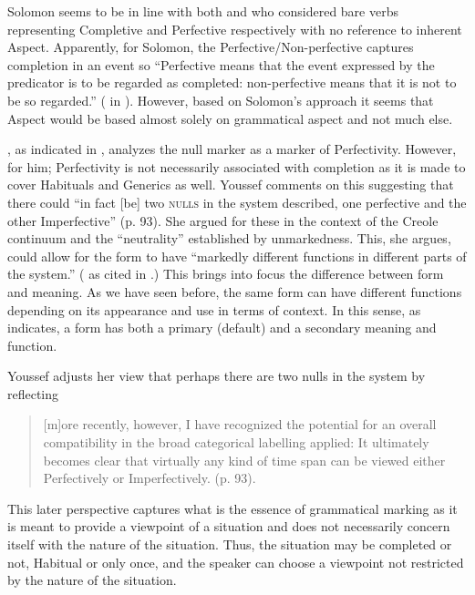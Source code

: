 Solomon seems to be in line with both \citet{Voorhoeve1957} and
\citet{Alleyne1980} who considered bare verbs representing Completive
and Perfective respectively with no reference to inherent Aspect.
Apparently, for Solomon, the Perfective\slash Non-perfective captures
completion in an event so “Perfective means that the event expressed
by the predicator is to be regarded as completed: non-perfective means
that it is not to be so regarded.” (\citealt[96]{Solomon1993} in \citealt[91]{Youssef2003}).  However,
based on Solomon’s approach it seems that Aspect would be based almost
solely on grammatical aspect and not much else.

\citet{Winford1993}, as indicated in , analyzes the
null marker as a marker of Perfectivity.  However, for him;
Perfectivity is not necessarily associated with completion as it is
made to cover Habituals and Generics as well.  Youssef comments on
this suggesting that there could “in fact [be] two \textsc{nulls} in the system
described, one perfective and the other Imperfective” (p.  93).  She
argued for these in the context of the Creole continuum and the
``neutrality'' established by unmarkedness.  This, she argues, could
allow for the form to have “markedly different functions in different
parts of the system.”  (\citealt{Youssef1995} as cited in \citealt[93]{Youssef2003}.)
This brings into focus the difference between form and
meaning.  As we have seen before, the same form can have different
functions depending on its appearance and use in terms of context.  In
this sense, as \citet{Winford1993} indicates, a form has both a
primary (default) and a secondary meaning and function.

Youssef adjusts her view that perhaps there are two nulls in the
system by reflecting

\begin{quote}
[m]ore recently, however, I have recognized the potential for an
overall compatibility in the broad categorical labelling applied: It
ultimately becomes clear that virtually any kind of time span can be
viewed either Perfectively or Imperfectively. (p. 93).
\end{quote}

This later perspective captures what is the essence of grammatical
marking as it is meant to provide a viewpoint of a situation and does
not necessarily concern itself with the nature of the situation. Thus,
the situation may be completed or not, Habitual or only once, and the
speaker can choose a viewpoint not restricted by the nature of the
situation.

